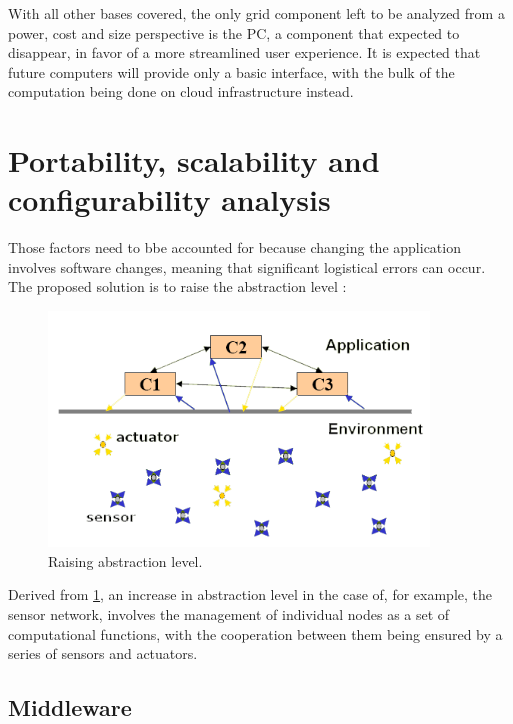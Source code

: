 \documentclass[12pt, english, a4paper]{report}
\begin{document}
With all other bases covered, the only grid component left to be analyzed from a power, cost and size perspective is the PC, a component
that expected to disappear, in favor of a more streamlined user experience. It is expected that future computers will provide only a basic
interface, with the bulk of the computation being done on cloud infrastructure instead. \cite{13}

\section{Portability, scalability and configurability analysis}

Those factors need to bbe accounted for because changing the application involves software changes, meaning that significant logistical
errors can occur. The proposed solution is to raise the abstraction level \cite{38}:

\begin{figure}[H]
	\includegraphics[width=0.9\textwidth, height=0.65\textwidth]{Pic3}
    \caption{Raising abstraction level. \cite{38} \label{fig:abstractionLevel}}
\end{figure}

Derived from \cref{fig:abstractionLevel}, an increase in abstraction level in the case of, for example, the sensor network, involves the
management of individual nodes as a set of computational functions, with the cooperation between them being ensured by a series of sensors
and actuators.

\subsection{Middleware}
\end{document}
